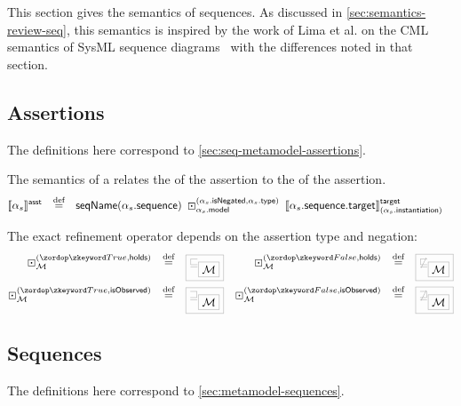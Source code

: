 
This section gives the \tockcsp{} semantics of \langname{} sequences.  As
discussed in \cref{sec:semantics-review-seq}, this
semantics is inspired by the work of Lima et al. on the CML semantics of
SysML sequence diagrams~\cite{lima-semantics} with the differences noted in
that section.

\subsection{Assertions}

The definitions here correspond to \cref{sec:seq-metamodel-assertions}.

\begin{definition}[\massertion]

\newcommand{\refop}[3]{\arefop_{#1}^{(#2, #3)}}

The semantics of a
\msequenceassertion{} relates the \msequence{} of the assertion to the
\mtarget{} of the assertion.
%
\begin{align*}
	\asstsema{\asasst}
\quad\defeq\quad&
	\seqnameOf{\field{\asasst}{sequence}}
	\;
	\refop{\field{\asasst}{model}}{\field{\asasst}{isNegated}}{\field{\asasst}{type}}
	\;
	\targetsema{\field{\field{\asasst}{sequence}}{target}}{\field{\asasst}{instantiation}}
\end{align*}

The exact refinement operator depends on the assertion type and negation:
%
\begin{align*}
	\refop{\amodel}{\true}{\mathsf{holds}}
\quad\defeq\quad&
	\tlang{\sqsubseteq_{\olang{\amodel}}}
&
	\refop{\amodel}{\false}{\mathsf{holds}}
\quad\defeq\quad&
	\tlang{\not\sqsubseteq_{\olang{\amodel}}}
\\
	\refop{\amodel}{\true}{\mathsf{isObserved}}
\quad\defeq\quad&
	\tlang{\sqsupseteq_{\olang{\amodel}}}
&
	\refop{\amodel}{\false}{\mathsf{isObserved}}
\quad\defeq\quad&
	\tlang{\not\sqsupseteq_{\olang{\amodel}}}
\\
\end{align*}
\end{definition}


\subsection{Sequences}\label{ssec:semantics-tockcsp-sequences}

The definitions here correspond to \cref{sec:metamodel-sequences}.

